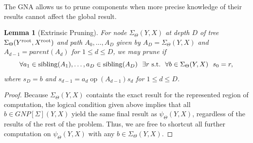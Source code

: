 \documentclass{article}
\newtheorem{lemma}{Lemma}
\newcommand{\killspace}{\vspace{-0.08in}}
\newcommand{\GNP}[1][\psi]{{#1}_{\Theta}}
\DeclareMathOperator{\sibling}{sibling}
\DeclareMathOperator{\op}{op}
\newcommand{\st}{{\rm~s.t.~}}
\newcommand{\kdroot}[1]{#1^{\text{\rm root}}}
\begin{document}
The GNA allows us to prune components when more precise knowledge of
their results cannot affect the global result.
\begin{lemma}[Extrinsic Pruning]\label{lem:extrinsic}
  For node $\GNP[\Sigma](Y,X)$ at depth $D$ of tree
  $\GNP[\Sigma](\kdroot{Y},\kdroot{X})$ and path $A_0,\ldots,A_D$ given by
  $A_D = \GNP[\Sigma](Y,X)$ and $A_{d-1} = parent(A_{d})$ for $1 \leq
  d \leq D$, we may prune if
  \[
  \forall a_1 \in \sibling(A_1),\ldots,a_D \in \sibling(A_D)~~ \exists r \st~ \forall b \in \GNP[\Sigma](Y,X)~~ s_0 = r,
  \]
  where $s_D = b$ and $s_{d-1} = a_d \mathbin{\op(A_{d-1})} s_d$ for $1 \leq d
    \leq D$.
\end{lemma}
\killspace
\killspace
\begin{proof}
  Because $\GNP[\Sigma](Y,X)$ containts the exact result for the
  represented region of computation, the logical condition given above
  implies that all $b \in GNP[\Sigma](Y,X)$ yield the same final
  result as $\GNP(Y,X)$, regardless of the results of the rest of the
  problem.  Thus, we are free to shortcut all further computation on
  $\GNP(Y,X)$ with any $b \in \GNP[\Sigma](Y,X)$.
\end{proof}
\end{document}
